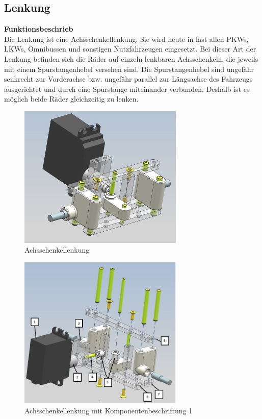 \subsection{Lenkung}
\textbf{Funktionsbeschrieb}\\[0.2cm]
Die Lenkung ist eine Achsschenkellenkung. Sie wird heute in fast allen PKWs, LKWs, Omnibussen und sonstigen Nutzfahrzeugen eingesetzt. Bei dieser Art der Lenkung befinden sich die Räder auf einzeln lenkbaren Achsschenkeln, die jeweils mit einem Spurstangenhebel versehen sind. Die Spurstangenhebel sind ungefähr senkrecht zur Vorderachse bzw. ungefähr parallel zur Längsachse des Fahrzeugs ausgerichtet und durch eine Spurstange miteinander verbunden. Deshalb ist es möglich beide Räder gleichzeitig zu lenken.\\[0.2cm]
\begin{figure}[H]%
\centering
\includegraphics[width=0.7\textwidth]{03_Loesungskonzept/pictures2/Lenkung.JPG}
\caption{Achsschenkellenkung}
\label{fig:activityRoute}
\end{figure}
\begin{figure}[H]%
\centering
\includegraphics[width=0.7\textwidth]{03_Loesungskonzept/pictures2/Lenkung_Explosion_1_lg.JPG}
\caption{Achsschenkellenkung mit Komponentenbeschriftung 1}
\label{fig:activityRoute}
\end{figure}
